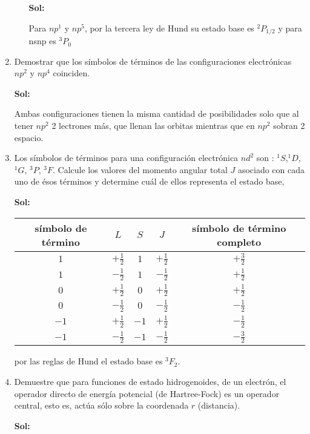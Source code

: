 \documentclass[12pt,a4paper]{article}
\begin{document}
\begin{enumerate}
\begin{enumerate}
    \textbf{Sol:}
    
    Para $np^1$ y $np^5$,  por la tercera ley de Hund su estado base es $^2P_{1/2}$ y para nsnp es $^3P_0$
    
\end{enumerate}








\item Demostrar que los símbolos de términos de las configuraciones electrónicas $np^2$ y $np^4$ coinciden.

\textbf{Sol:}

Ambas configuraciones tienen la misma cantidad de posibilidades solo que  al tener $np^2$ 2 lectrones más, que llenan las orbitas mientras que en $np^2$ sobran 2 espacio.









\item Los símbolos de términos para una configuración electrónica $nd^2$ son : $^1S$,$^1D$, $^1G$, $^3P$, $^3F$. Calcule los valores del momento angular total $J$ asociado con cada uno de ésos términos y determine cuál de ellos representa el estado base,

\textbf{Sol:}

    \begin{table}[h!]
        \centering
        \begin{tabular}{|c|c|c|c|c|}
        \hline
            símbolo de término & $L$ & $S$ & $J$ & símbolo de término completo  \\
            \hline
             $1$ & $+\frac{1}{2}$ & $1$ & $+\frac{1}{2}$ &$+\frac{3}{2}$\\
             $1$ & $-\frac{1}{2}$ &$1$ & $-\frac{1}{2}$ &$+\frac{1}{2}$\\
             $0$ & $+\frac{1}{2}$ &$0$ & $+\frac{1}{2}$ &$+\frac{1}{2}$\\
             $0$ & $-\frac{1}{2}$ & $0$ & $-\frac{1}{2}$ &$-\frac{1}{2}$\\
             $-1$ & $+\frac{1}{2}$ & $-1$ & $+\frac{1}{2}$ &$-\frac{1}{2}$\\
             $-1$ & $-\frac{1}{2}$ &  $-1$ & $-\frac{1}{2}$ &$-\frac{3}{2}$\\
             \hline
        \end{tabular}
    \end{table}
    
    por las reglas de Hund el estado base es $^3F_2$.








\item Demuestre que para funciones de estado hidrogenoides, de un electrón, el operador directo de energía potencial (de Hartree-Fock) es un operador central, esto es, actúa sólo sobre la coordenada $r$ (distancia).

\textbf{Sol:}




\end{enumerate}
\end{document}
